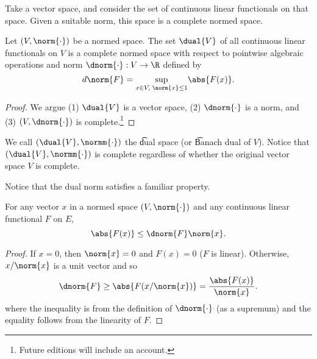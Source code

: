 

Take a vector space, and consider the set of continuous linear functionals on that space.
Given a suitable norm, this space is a complete normed space.


\begin{proposition}
	Let $(V, \norm{\cdot})$ be a normed space.
	The set $\dual{V}$ of all continuous linear functionals on $V$ is a complete normed space with respect to pointwise algebraic operations and norm $\dnorm{\cdot}: V \to \R$ defined by
	\[
		d\norm{F} = \underset{x \in V, \;\norm{x} \leq 1}{\sup} \abs{F(x)}.
	\]
	\begin{proof}
	We argue (1) $\dual{V}$ is a vector space,  (2) $\dnorm{\cdot}$ is a norm, and (3) $(V, \dnorm{\cdot})$ is complete.\footnote{Future editions will include an account.}
	\end{proof}
\end{proposition}

We call $(\dual{V}, \normm{\cdot})$ the \t{dual space} (or \t{Banach dual of $V$}).
Notice that $(\dual{V}, \normm{\cdot})$ is complete regardless of whether the original vector space $V$ is complete.


Notice that the dual norm satisfies a familiar property.

\begin{proposition}
	For any vector $x$ in a normed space $(V, \norm{\cdot})$ and any continuous linear functional $F$ on $E$,
	\[
		\abs{F(x)} \leq \dnorm{F}\norm{x}.
	\]
	\begin{proof}
		If $x = 0$, then $\norm{x} = 0$ and $F(x) = 0$ ($F$ is linear). Otherwise, $x/\norm{x}$ is a unit vector and so
		\[
			\dnorm{F} \geq \abs{F(x/\norm{x})} = \frac{\abs{F(x)}}{\norm{x}}.
		\]
		where the inequality is from the definition of $\dnorm{\cdot}$ (as a supremum) and the equality follows from the linearity of $F$.
	\end{proof}
\end{proposition}
